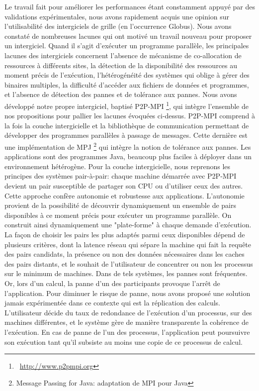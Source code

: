 \documentclass[11pt]{article}
\newcommand{\pmpi}{\mbox{\textsc{P2P-MPI}}}
\begin{document}
Le travail fait pour améliorer les performances étant constamment appuyé par des validations
expérimentales, nous avons rapidement acquis une opinion sur l'utilisabilité des intergiciels
de grille (en l'occurrence Globus). Nous avons constaté de nombreuses lacunes qui ont motivé
un travail nouveau pour proposer un intergiciel.
Quand il s'agit d'exécuter un programme parallèle, les principales lacunes des intergiciels
concernent l'absence de mécanisme de co-allocation de ressources à différents sites, la
détection de la disponibilité des ressources au moment précis de l'exécution, l'hétérogénéité
des systèmes qui oblige à gérer des binaires multiples, la difficulté d'accéder aux fichiers
de données et programmes, et l'absence de détection des pannes et de tolérance aux pannes. 
Nous avons développé notre propre intergiciel, baptisé {\pmpi}%
\footnote{~\url{http://www.p2pmpi.org}},
qui intègre l'ensemble de nos propositions pour pallier les lacunes évoquées ci-dessus.
{\pmpi} comprend à la fois la couche intergicielle et la bibliothèque de communication
permettant de développer des programmes parallèles à passage de messages. Cette 
dernière est une implémentation de MPJ%
\footnote{Message Passing for Java: adaptation de MPI pour Java}
qui intègre la notion de tolérance aux pannes.
Les applications sont des programmes Java, beaucoup plus faciles à déployer dans un 
environnement hétérogène.
Pour la couche intergicielle, nous reprenons les principes des systèmes pair-à-pair: 
chaque machine démarrée avec {\pmpi} devient un pair susceptible de partager son
CPU ou d'utiliser ceux des autres. Cette approche confère autonomie et robustesse aux 
applications. L'autonomie provient de la possibilité de découvrir dynamiquement
un ensemble de pairs disponibles à ce moment précis pour exécuter un programme parallèle.
On construit ainsi dynamiquement une "plate-forme" à chaque demande d'exécution. La façon de
choisir les pairs les plus adaptés parmi ceux disponibles dépend de plusieurs critères, dont
la latence réseau qui sépare la machine qui fait la requête des pairs candidats, la présence
ou non des données nécessaires dans les caches des pairs distants, et le souhait de l'utilisateur
de concentrer ou non les processus sur le minimum de machines.
Dans de tels systèmes, les pannes sont fréquentes. Or, lors d'un calcul, la panne d'un des 
participants provoque l'arrêt de l'application. Pour diminuer le risque de panne, nous avons 
proposé une solution jamais expérimentée dans ce contexte qui est la réplication des calculs. 
L'utilisateur décide du taux de redondance de l'exécution d'un processus, sur des machines 
différentes, et le système gère de manière transparente la cohérence de l'exécution. En cas de 
panne de l'un des processus, l'application peut poursuivre son exécution tant qu'il subsiste 
au moins une copie de ce processus de calcul.\\
\end{document}
